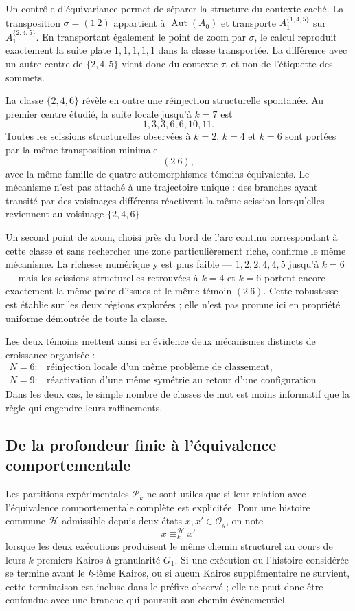 \documentclass[11pt,a4paper]{article}
\theoremstyle{definition}
\theoremstyle{remark}
\begin{document}
Un contrôle d'équivariance permet de séparer la structure du contexte caché. La transposition $\sigma=(1\ 2)$ appartient à $\operatorname{Aut}(A_0)$ et transporte $A_1^{\{1,4,5\}}$ sur $A_1^{\{2,4,5\}}$. En transportant également le point de zoom par $\sigma$, le calcul reproduit exactement la suite plate $1,1,1,1,1$ dans la classe transportée. La différence avec un autre centre de $\{2,4,5\}$ vient donc du contexte $\tau$, et non de l'étiquette des sommets.

La classe $\{2,4,6\}$ révèle en outre une réinjection structurelle spontanée. Au premier centre étudié, la suite locale jusqu'à $k=7$ est
\[
1,3,3,6,6,10,11.
\]
Toutes les scissions structurelles observées à $k=2$, $k=4$ et $k=6$ sont portées par la même transposition minimale
\[
(2\ 6),
\]
avec la même famille de quatre automorphismes témoins équivalents. Le mécanisme n'est pas attaché à une trajectoire unique : des branches ayant transité par des voisinages différents réactivent la même scission lorsqu'elles reviennent au voisinage $\{2,4,6\}$.

Un second point de zoom, choisi près du bord de l'arc continu correspondant à cette classe et sans rechercher une zone particulièrement riche, confirme le même mécanisme. La richesse numérique y est plus faible --- $1,2,2,4,4,5$ jusqu'à $k=6$ --- mais les scissions structurelles retrouvées à $k=4$ et $k=6$ portent encore exactement la même paire d'issues et le même témoin $(2\ 6)$. Cette robustesse est établie sur les deux régions explorées ; elle n'est pas promue ici en propriété uniforme démontrée de toute la classe.

Les deux témoins mettent ainsi en évidence deux mécanismes distincts de croissance organisée :
\[
\boxed{
\begin{array}{ll}
N=6:& \text{réinjection locale d'un même problème de classement,}\\[1mm]
N=9:& \text{réactivation d'une même symétrie au retour d'une configuration structurelle.}
\end{array}}
\]
Dans les deux cas, le simple nombre de classes de mot est moins informatif que la règle qui engendre leurs raffinements.


\subsection{De la profondeur finie à l'équivalence comportementale}

Les partitions expérimentales $\mathcal P_k$ ne sont utiles que si leur relation avec l'équivalence comportementale complète est explicitée. Pour une histoire commune $\mathcal H$ admissible depuis deux états $x,x'\in \mathcal O_y$, on note
\[
x\equiv_k^{\mathcal H}x'
\]
lorsque les deux exécutions produisent le même chemin structurel au cours de leurs $k$ premiers Kairos à granularité $G_1$. Si une exécution ou l'histoire considérée se termine avant le $k$-ième Kairos, ou si aucun Kairos supplémentaire ne survient, cette terminaison est incluse dans le préfixe observé ; elle ne peut donc être confondue avec une branche qui poursuit son chemin événementiel.
\end{document}
